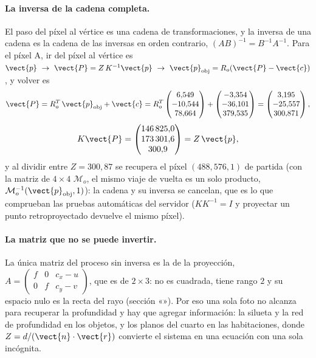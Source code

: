 \paragraph{La inversa de la cadena completa.} El paso del píxel al vértice es una cadena de transformaciones, y la inversa de una cadena es la cadena de
las inversas en orden contrario, $(AB)^{-1}=B^{-1}A^{-1}$. Para el píxel A, ir del píxel al vértice es $\vect{p}\ \to\ \vect{P}=Z\,K^{-1}\vect{p}\ \to\
\vect{p}_{\text{obj}}=R_o(\vect{P}-\vect{c})$, y volver es
\begin{equation}
\vect{P}=R_o^{T}\,\vect{p}_{\text{obj}}+\vect{c}=R_o^{T}\begin{pmatrix} 6{,}549 \\ -10{,}544 \\ 78{,}664 \end{pmatrix}+\begin{pmatrix} -3{,}354 \\ -36{,}101 \\ 379{,}535 \end{pmatrix}=\begin{pmatrix} 3{,}195 \\ -25{,}557 \\ 300{,}871 \end{pmatrix},
\end{equation}
\begin{equation}
K\vect{P}=\begin{pmatrix} 146\,825{,}0 \\ 173\,301{,}6 \\ 300{,}9 \end{pmatrix}=Z\,\vect{p},
\end{equation}
y al dividir entre $Z=300{,}87$ se recupera el píxel $(488,576,1)$ de partida (con la matriz de $4\times4$ $\mathcal{M}_o$, el mismo viaje de vuelta es un solo
producto, $\mathcal{M}_o^{-1}(\vect{p}_{\text{obj}},1)$): la cadena y su inversa se cancelan, que es lo que
comprueban las pruebas automáticas del servidor ($KK^{-1}=I$ y proyectar un punto retroproyectado devuelve el mismo píxel).

\paragraph{La matriz que no se puede invertir.} La única matriz del proceso sin inversa es la de la proyección, $A=\begin{pmatrix}f&0&c_x-u\\0&f&c_y-v\end{pmatrix}$,
que es de $2\times3$: no es cuadrada, tiene rango $2$ y su espacio nulo es la recta del rayo (sección «\nameref{sec:casco-retro}»). Por eso una sola foto no
alcanza para recuperar la profundidad y hay que agregar información: la silueta y la red de profundidad en los objetos, y los planos del cuarto en las
habitaciones, donde $Z=d/(\vect{n}\cdot\vect{r})$ convierte el sistema en una ecuación con una sola incógnita.
